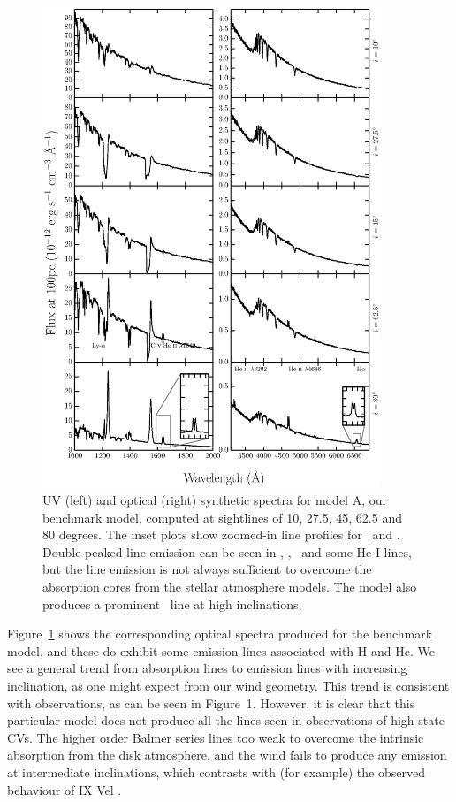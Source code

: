 \documentclass[preprint, a4paper, 11pt]{aastex}
\begin{document}
\begin{figure} %
\includegraphics[width=0.9\textwidth]{figures/modela_uv_opt.eps}
\caption{
UV (left) and optical (right) synthetic spectra for model A, our benchmark model,
computed at sightlines of 10, 27.5, 45, 62.5 and 80 degrees.	
The inset plots show zoomed-in line profiles for 
\heiiuv\ and \ha. Double-peaked line emission can be seen in 
\heiiuv, \heiiopt, \ha\ and some He I lines, but the 
line emission is not always sufficient to overcome the absorption
cores from the stellar atmosphere models. The model
also produces a prominent \heiioptnew\ line at high inclinations,
}
\label{spec}
\end{figure} %

Figure~\ref{spec} shows the corresponding optical spectra produced for
the benchmark model, and these do exhibit some emission lines
associated with H and He. 
We see a general trend from absorption lines to emission lines 
with increasing inclination, as one might expect from our wind
geometry. This trend is consistent with observations, as can be seen
in Figure~1. However, it is clear that this particular model
does not produce all the lines seen in observations of high-state CVs.
The higher order Balmer series lines too weak
to overcome the intrinsic absorption from the disk atmosphere, and the wind 
fails to produce any emission at intermediate inclinations, 
which contrasts with (for example) the observed behaviour of IX Vel
\citep{beuermann1990}.
\end{document}
